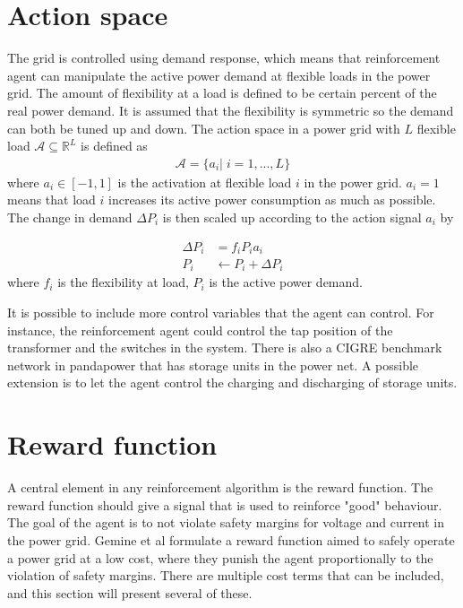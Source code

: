 \documentclass[class=book, crop=false]{standalone}
\begin{document}
\section{Action space}
The grid is controlled using demand response, which means that reinforcement agent can manipulate the active power demand at flexible loads in the power grid. The amount of flexibility at a load is defined to be certain percent of the real power demand. It is assumed that the flexibility is symmetric so the demand can both be tuned up and down. The action space in a power grid with $L$ flexible load  $\mathcal{A}  \subseteq \mathbb{R}^{L}$ is defined as
\begin{equation}
   \begin{aligned}
   \label{eq:problem:action_space}
\mathcal{A}= \{a_{i} | \;i = 1,...,L\}
    \end{aligned} 
\end{equation}
where $a_{i} \in [-1,1]$ is the activation at flexible load $i$ in the power grid. $a_{i} = 1$ means that load $i$ increases its active power consumption as much as possible. The change in demand $\Delta P_{i}$ is then scaled up according to the action signal $a_{i}$ by

\begin{equation}
   \begin{aligned}
   \label{eq:problem:update_demand}
    \Delta P_{i}& = f_{i}P_{i}a_{i} \\
    P_{i}& \leftarrow P_{i} + \Delta P_{i}
    \end{aligned} 
\end{equation}
where $f_{i}$ is the flexibility at load, $P_{i}$ is the active power demand.

It is possible to include more control variables that the agent can control. For instance, the reinforcement agent could control the tap position of the transformer and the switches in the system. There is also a CIGRE benchmark network in pandapower that has storage units in the power net. A possible extension is to let the agent control the charging and discharging of storage units.

\section{Reward function}\label{section:reward}
A central element in any reinforcement algorithm is the reward function. The reward function should give a signal that is used to reinforce "good" behaviour. The goal of the agent is to not violate safety margins for voltage and current in the power grid. Gemine et al formulate a reward function aimed to safely operate a power grid at a low cost, where they punish the agent proportionally to the violation of safety margins\cite{active_network_management}. There are multiple cost terms that can be included, and this section will present several of these. 
\end{document}
